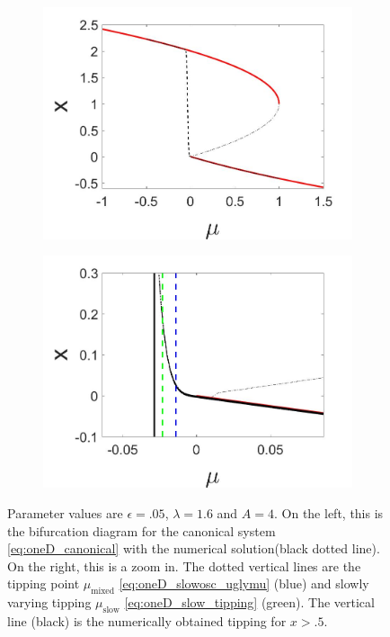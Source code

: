 \begin{figure}[H]
\centering
\begin{subfigure}{.5\textwidth}
 \centering
 \includegraphics[width=\linewidth]{oneD/slowosc_bif_diagram_large.jpg}
 \caption{}
\end{subfigure}%
\begin{subfigure}{.5\textwidth}
 \centering
 \includegraphics[width=\linewidth]{oneD/slowosc_bif_diagram_large_zoom.jpg}
 \caption{}
\end{subfigure}
\caption{Parameter values are $\epsilon=.05$, $\lambda=1.6$ and $A=4$. On the left, this is the bifurcation diagram for the canonical system \eqref{eq:oneD_canonical} with the numerical solution(black dotted line). On the right, this is a zoom in. The dotted vertical lines are the tipping point $\mu_{\text{mixed}}$ \eqref{eq:oneD_slowosc_uglymu} (blue) and slowly varying tipping $\mu_{\text{slow}}$ \eqref{eq:oneD_slow_tipping} (green). The vertical line (black) is the numerically obtained tipping for $x>.5$.}
\label{fig:oneD_slowosc_numerical_large}
\end{figure}

